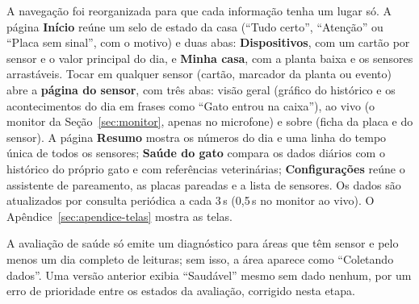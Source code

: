 A navegação foi reorganizada para que cada informação tenha um lugar só. A página \textbf{Início} reúne um selo de estado da casa (``Tudo certo'', ``Atenção'' ou ``Placa sem sinal'', com o motivo) e duas abas: \textbf{Dispositivos}, com um cartão por sensor e o valor principal do dia, e \textbf{Minha casa}, com a planta baixa e os sensores arrastáveis. Tocar em qualquer sensor (cartão, marcador da planta ou evento) abre a \textbf{página do sensor}, com três abas: visão geral (gráfico do histórico e os acontecimentos do dia em frases como ``Gato entrou na caixa''), ao vivo (o monitor da Seção~\ref{sec:monitor}, apenas no microfone) e sobre (ficha da placa e do sensor). A página \textbf{Resumo} mostra os números do dia e uma linha do tempo única de todos os sensores; \textbf{Saúde do gato} compara os dados diários com o histórico do próprio gato e com referências veterinárias; \textbf{Configurações} reúne o assistente de pareamento, as placas pareadas e a lista de sensores. Os dados são atualizados por consulta periódica a cada 3\,s (0,5\,s no monitor ao vivo). O Apêndice~\ref{sec:apendice-telas} mostra as telas.

A avaliação de saúde só emite um diagnóstico para áreas que têm sensor e pelo menos um dia completo de leituras; sem isso, a área aparece como ``Coletando dados''. Uma versão anterior exibia ``Saudável'' mesmo sem dado nenhum, por um erro de prioridade entre os estados da avaliação, corrigido nesta etapa.
